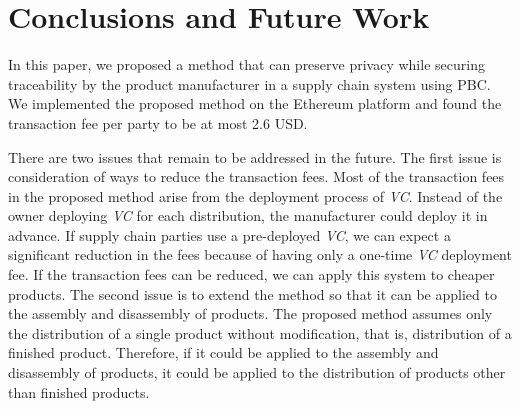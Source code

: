 \documentclass[conference]{IEEEtran}
\begin{document}
\section{Conclusions and Future Work}
\label{sec:conclusions}
In this paper, we proposed a method that can preserve privacy while securing traceability by the product manufacturer in a supply chain system using PBC.
We implemented the proposed method on the Ethereum platform and found the transaction fee per party to be at most 2.6 USD.

There are two issues that remain to be addressed in the future.
The first issue is consideration of ways to reduce the transaction fees.
Most of the transaction fees in the proposed method arise from the deployment process of \textit{VC}.
Instead of the owner deploying \textit{VC} for each distribution, the manufacturer could deploy it in advance.
If supply chain parties use a pre-deployed \textit{VC}, we can expect a significant reduction in the fees because of having only a one-time \textit{VC} deployment fee.
If the transaction fees can be reduced, we can apply this system to cheaper products.
The second issue is to extend the method so that it can be applied to the assembly and disassembly of products.
The proposed method assumes only the distribution of a single product without modification, that is, distribution of a finished product.
Therefore, if it could be applied to the assembly and disassembly of products, it could be applied to the distribution of products other than finished products.













\clearpage
\end{document}
